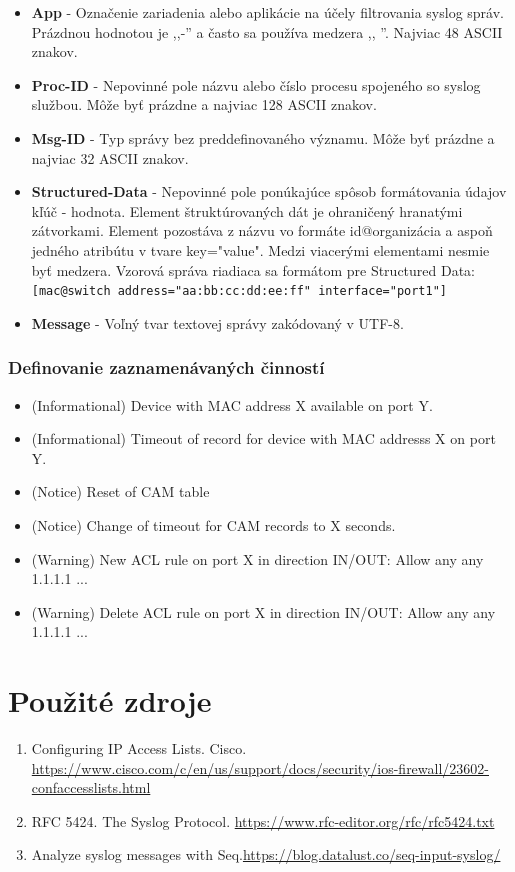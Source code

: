 \documentclass[12pt, a4paper]{article}
\begin{document}
\begin{itemize}
\item \textbf{App} - Označenie zariadenia alebo aplikácie na účely filtrovania syslog správ. Prázdnou hodnotou je ,,-'' a často sa používa medzera ,, ''. Najviac 48 ASCII znakov.
\item \textbf{Proc-ID} - Nepovinné pole názvu alebo číslo procesu spojeného so syslog službou. Môže byť prázdne a najviac 128 ASCII znakov.
\item \textbf{Msg-ID} - Typ správy bez preddefinovaného významu. Môže byť prázdne a najviac 32 ASCII znakov.
\item \textbf{Structured-Data} - Nepovinné pole ponúkajúce spôsob formátovania údajov kľúč - hodnota. Element štruktúrovaných dát
je ohraničený hranatými zátvorkami. Element pozostáva z názvu vo formáte id@organizácia a aspoň jedného atribútu v tvare
key="value". Medzi viacerými elementami nesmie byť medzera. Vzorová správa riadiaca sa formátom pre Structured Data: \\
\verb|[mac@switch address="aa:bb:cc:dd:ee:ff" interface="port1"]|
\item \textbf{Message} - Voľný tvar textovej správy zakódovaný v UTF-8.
\end{itemize}

\subsubsection{Definovanie zaznamenávaných činností}
\begin{itemize}
\setlength\itemsep{0em}
\item (Informational) Device with MAC address X available on port Y.
\item (Informational) Timeout of record for device with MAC addresss X on port Y.
\item (Notice) Reset of CAM table
\item (Notice) Change of timeout for CAM records to X seconds.
\item (Warning) New ACL rule on port X in direction IN/OUT: Allow any any 1.1.1.1 ...
\item (Warning) Delete ACL rule on port X in direction IN/OUT: Allow any any 1.1.1.1 ...
\end{itemize}
\section*{Použité zdroje}
\begin{enumerate}
\item Configuring IP Access Lists. Cisco. \url{https://www.cisco.com/c/en/us/support/docs/security/ios-firewall/23602-confaccesslists.html}
\item RFC 5424. The Syslog Protocol. \url{https://www.rfc-editor.org/rfc/rfc5424.txt}
\item Analyze syslog messages with Seq.\url{https://blog.datalust.co/seq-input-syslog/}
\end{enumerate}
\newpage
\end{document}
